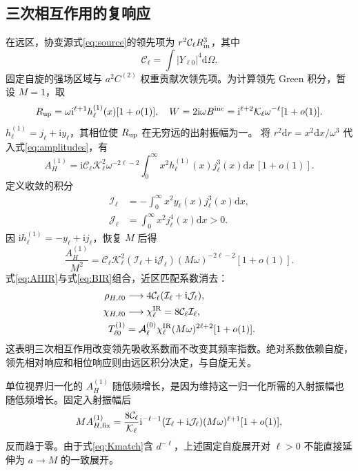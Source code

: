 \documentclass[UTF8,fontset=fandol,11pt,a4paper]{ctexart}
\newcommand{\ii}{\mathrm i}
\newcommand{\dd}{\mathrm d}
\newcommand{\Bin}{B^{\mathrm{inc}}}
\newcommand{\AH}{A_H^{(1)}}
\numberwithin{equation}{section}
\begin{document}
\subsection{三次相互作用的复响应}
在远区，协变源式\eqref{eq:source}的领先项为 $r^2\mathcal C_\ell R_{\rm in}^3$，其中
\begin{equation}\mathcal C_\ell=\int|Y_{\ell0}|^4\dd\Omega.\end{equation}
固定自旋的强场区域与 $a^2C^{(2)}$ 权重贡献次领先项。为计算领先 Green 积分，暂设 $M=1$，取
\begin{equation}
R_{\rm up}=\omega\ii^{\ell+1}h_\ell^{(1)}(x)[1+o(1)],\quad
W=2\ii\omega\Bin=\ii^{\ell+2}\mathcal K_\ell\omega^{-\ell}[1+o(1)].
\end{equation}
$h_\ell^{(1)}=j_\ell+\ii y_\ell$，其相位使 $R_{\rm up}$ 在无穷远的出射振幅为一。
将 $r^2\dd r=x^2\dd x/\omega^3$ 代入式\eqref{eq:amplitudes}，有
\begin{equation}
\AH=\ii\mathcal C_\ell\mathcal K_\ell^2\omega^{-2\ell-2}
\int_0^\infty x^2 h_\ell^{(1)}(x)j_\ell^3(x)\dd x\,[1+o(1)].
\end{equation}
定义收敛的积分
\begin{align}
\mathcal I_\ell&=-\int_0^\infty x^2y_\ell(x)j_\ell^3(x)\dd x,\\
\mathcal J_\ell&=\int_0^\infty x^2j_\ell^4(x)\dd x>0.
\end{align}
因 $\ii h_\ell^{(1)}=-y_\ell+\ii j_\ell$，恢复 $M$ 后得
\begin{equation}
\frac{\AH}{M^2}=\mathcal C_\ell\mathcal K_\ell^2
(\mathcal I_\ell+\ii\mathcal J_\ell)(M\omega)^{-2\ell-2}[1+o(1)].\label{eq:AHIR}
\end{equation}
式\eqref{eq:AHIR}与式\eqref{eq:BIR}组合，近区匹配系数消去：
\begin{align}
\rho_{H,\ell0}&\longrightarrow4\mathcal C_\ell(\mathcal I_\ell+\ii\mathcal J_\ell),\label{eq:rhoIR}\\
\chi_{H,\ell0}&\longrightarrow\chi_\ell^{\rm IR}=8\mathcal C_\ell\mathcal I_\ell,\\
T^{(1)}_{\ell0}&=\mathcal A_\ell^{(0)}\chi_\ell^{\rm IR}(M\omega)^{2\ell+2}[1+o(1)].\label{eq:T1IR}
\end{align}
这表明三次相互作用改变领先吸收系数而不改变其频率指数。绝对系数依赖自旋，领先相对响应和相位响应则由远区积分决定，与自旋无关。

单位视界归一化的 $\AH$ 随低频增长，是因为维持这一归一化所需的入射振幅也随低频增长。固定入射振幅后
\begin{equation}
M A_{H,\rm fix}^{(1)}=\frac{8\mathcal C_\ell}{\mathcal K_\ell}\ii^{-\ell-1}
(\mathcal I_\ell+\ii\mathcal J_\ell)(M\omega)^{\ell+1}[1+o(1)],
\end{equation}
反而趋于零。由于式\eqref{eq:Kmatch}含 $d^{-\ell}$，上述固定自旋展开对 $\ell>0$ 不能直接延伸为 $a\to M$ 的一致展开。
\end{document}
